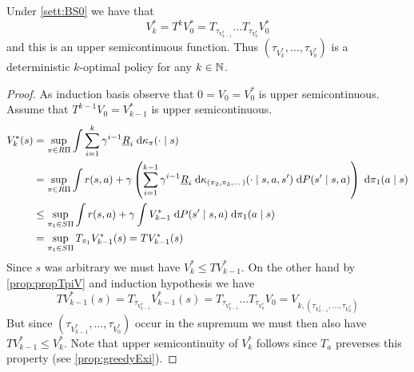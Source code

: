 \begin{prop}
  Under \cref{sett:BS0} we have that
  \[ V^*_k = T^k V_0^* = T_{\tau_{V^*_{k-1}}} \dots T_{\tau_{V^*_0}} V_0^* \]
  and this is an upper semicontinuous function.
  Thus $(\tau_{V^*_k}, \dots, \tau_{V_0^*})$ is a deterministic
  $k$-optimal policy for any $k \in \mathbb{N}$.
  \label{prop:kOpt}
\end{prop}
\begin{proof}
  As induction basis observe that $0 = V_0 = V_0^*$ is upper semicontinuous.
  Assume that $T^{k-1} V_0 = V^*_{k-1}$ is upper semicontinuous.
  \begin{align*}
    V^*_k(s) &= \sup_{\pi \in R\Pi} \int \sum_{i=1}^k \gamma^{i-1}
    \underline{R}_i \; \mathrm{d} \kappa_\pi(\cdot \mid s)
    \\ &= \sup_{\pi \in R\Pi} \int r(s, a) + \gamma \left(
      \sum_{i=1}^{k-1} \gamma^{i-1} \underline{R}_i \; \mathrm{d}
      \kappa_{(\pi_2, \pi_3, \dots)}(\cdot \mid s, a, s')
    \; \mathrm{d} P(s' \mid s, a) \right) \; \mathrm{d} \pi_1(a \mid s)
    \\ &\leq \sup_{\pi_1 \in S\Pi} \int r(s, a) + \gamma \int V^*_{k-1}
    \; \mathrm{d} P(s' \mid s, a) \; \mathrm{d} \pi_1(a \mid s)
    \\ &= \sup_{\pi_1 \in S\Pi} T_{\pi_1} V^*_{k-1}(s) = T V^*_{k-1}(s) 
  \end{align*}
  Since $s$ was arbitrary we must have $V_k^* \leq TV_{k-1}^*$.
  On the other hand by \cref{prop:propTpiV} and induction hypothesis we have
  \[T V^*_{k-1}(s) = T_{\tau_{V^*_{k-1}}} V^*_{k-1}(s)
    = T_{\tau_{V^*_{k-1}}} \dots T_{\tau_{V^*_0}} V_0
  = V_{k, (\tau_{V^*_{k-1}}, \dots, \tau_{V^*_0})} \]
  But since $(\tau_{V^*_{k-1}}, \dots, \tau_{V^*_0})$ occur in the supremum
  we must then also have $TV_{k-1}^* \leq V^*_k$.
  Note that upper semicontinuity of $V^*_k$ follows since $T_a$ preverses
  this property (see \cref{prop:greedyExi}).
\end{proof}

